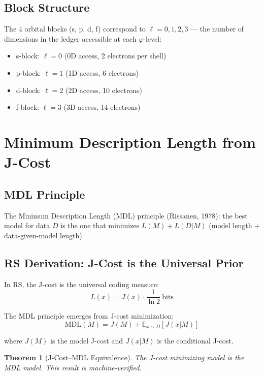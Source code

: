 \documentclass[12pt,a4paper]{article}
\newtheorem{theorem}{Theorem}[section]
\theoremstyle{definition}
\theoremstyle{remark}
\begin{document}
\subsection{Block Structure}

The 4 orbital blocks (s, p, d, f) correspond to $\ell = 0, 1, 2, 3$ — 
the number of dimensions in the ledger accessible at each $\varphi$-level:
\begin{itemize}
\item s-block: $\ell = 0$ (0D access, 2 electrons per shell)
\item p-block: $\ell = 1$ (1D access, 6 electrons)
\item d-block: $\ell = 2$ (2D access, 10 electrons)
\item f-block: $\ell = 3$ (3D access, 14 electrons)
\end{itemize}

\section{Minimum Description Length from J-Cost}

\subsection{MDL Principle}

The Minimum Description Length (MDL) principle (Rissanen, 1978): 
the best model for data $D$ is the one that minimizes $L(M) + L(D|M)$ 
(model length + data-given-model length).

\subsection{RS Derivation: J-Cost is the Universal Prior}

In RS, the J-cost is the universal coding measure:
\begin{equation}
L(x) = J(x) \cdot \frac{1}{\ln 2}~\text{bits}
\end{equation}

The MDL principle emerges from J-cost minimization:
\begin{equation}
\text{MDL}(M) = J(M) + \mathbb{E}_{x \sim D}[J(x|M)]
\end{equation}

where $J(M)$ is the model J-cost and $J(x|M)$ is the conditional J-cost.

\begin{theorem}[J-Cost--MDL Equivalence]
\label{thm:mdl}
The J-cost minimizing model is the MDL model.
This result is machine-verified.
\end{theorem}
\end{document}

